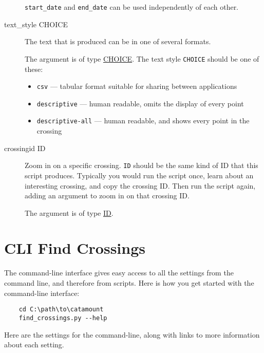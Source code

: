 \begin{description}
\verb=start_date= and \verb=end_date= can be used independently of
each other.

\item[text\_style CHOICE]
\hypertarget{crossing-text-style}{}

The text that is produced can be in one of several formats.

The argument is of type \hyperlink{argument-type-choice}{CHOICE}. The text
style \verb=CHOICE= should be one of these:

\begin{itemize}
\item \verb=csv= --- tabular format suitable for sharing between applications
\item \verb=descriptive= --- human readable, omits the display of every point
\item \verb=descriptive-all= --- human readable, and shows every point in the crossing
\end{itemize}

\item[crossingid ID]
\hypertarget{crossing-crossingid}{}

Zoom in on a specific crossing. \verb=ID= should be the same kind of
ID that this script produces. Typically you would run the script once, learn
about an interesting crossing, and copy the crossing ID. Then run the script
again, adding an argument to zoom in on that crossing ID.

The argument is of type \hyperlink{argument-type-id}{ID}.

\end{description}


\section{CLI Find Crossings}

The command-line interface gives easy access to all the settings from the
command line, and therefore from scripts. Here is how you get started with
the command-line interface:

\begin{verbatim}
    cd C:\path\to\catamount
    find_crossings.py --help
\end{verbatim}

Here are the settings for the command-line, along with links to
more information about each setting.

